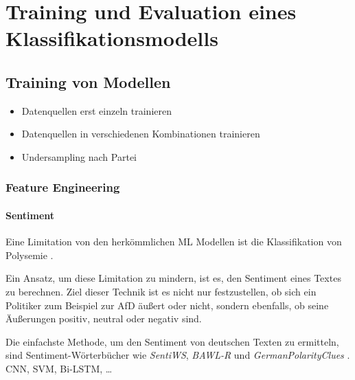 
\chapter{Training und Evaluation eines Klassifikationsmodells} \label{ch:crispDm_2}

\section{Training von Modellen} \label{sec:modeling}


\begin{itemize}
    \item Datenquellen erst einzeln trainieren
    \item Datenquellen in verschiedenen Kombinationen trainieren
    \item Undersampling nach Partei 
\end{itemize}

\subsection{Feature Engineering} \label{subsec:featureEngineering}


\subsubsection{Sentiment}

Eine Limitation von den herkömmlichen \ac{ML} Modellen ist die Klassifikation von Polysemie \autocite[48\psq]{kowsari_text_2019}. 


Ein Ansatz, um diese Limitation zu mindern, ist es, den Sentiment eines Textes zu berechnen. Ziel dieser Technik ist es nicht nur festzustellen, ob sich ein Politiker zum Beispiel zur \ac{AfD} äußert oder nicht, sondern ebenfalls, ob seine Äußerungen positiv, neutral oder negativ sind.


Die einfachste Methode, um den Sentiment von deutschen Texten zu ermitteln, sind Sentiment-Wörterbücher wie \textit{SentiWS}, \textit{BAWL-R} und \textit{GermanPolarityClues} \autocite[1627\psq]{guhr_training_2020}. CNN, SVM, Bi-LSTM, \dots

